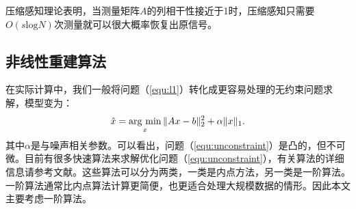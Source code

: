 压缩感知理论表明，当测量矩阵$A$的列相干性接近于1时，压缩感知只需要$O(s\mathrm{log}N)$次测量就可以很大概率恢复出原信号。

\subsection{非线性重建算法}
在实际计算中，我们一般将问题（\ref{equ:l1}）转化成更容易处理的无约束问题求解，模型变为：
\begin{equation}
	\hat{x}=\argmin_x \|Ax-b\|_2^2 + \alpha\|x\|_1.
	\label{equ:unconstraint}
\end{equation}
其中$\alpha$是与噪声相关参数。可以看出，问题（\ref{equ:unconstraint}）是凸的，但不可微。目前有很多快速算法来求解优化问题（\ref{equ:unconstraint}），有关算法的详细信息请参考文献\cite{proximal}。这些算法可以分为两类，一类是内点方法，另一类是一阶算法。一阶算法通常比内点算法计算更简便，也更适合处理大规模数据的情形。因此本文主要考虑一阶算法。

